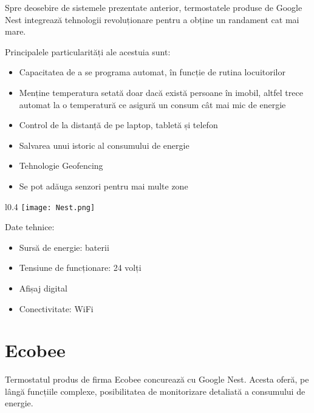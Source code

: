 	Spre deosebire de sistemele prezentate anterior, termostatele produse de Google Nest integrează tehnologii revoluționare pentru a obține un randament cat mai mare.

\vspace{2em}

	Principalele particularități ale acestuia sunt:
	\begin{itemize}
	\setlength{\itemindent}{2em}
		\itemsep0em
		\item Capacitatea de a se programa automat, în funcție de rutina locuitorilor
		\item Menține temperatura setată doar dacă există persoane în imobil, altfel trece automat la o temperatură ce asigură un consum cât mai mic de energie
		\item Control de la distanță de pe laptop, tabletă și telefon
		\item Salvarea unui istoric al consumului de energie
		\item Tehnologie Geofencing
		\item Se pot adăuga senzori pentru mai multe zone
	\end{itemize}

\vspace{2em}

\begin{wrapfigure}[5]{l}{0.4\textwidth}
\centering
\texttt{[image: Nest.png]}
\end{wrapfigure}

	Date tehnice:
	\begin{itemize}
	\setlength{\itemindent}{2em}
		\itemsep0em
		\item Sursă de energie: baterii
		\item Tensiune de funcționare: 24 volți
		\item Afișaj digital
		\item Conectivitate: WiFi
	\end{itemize}

\vspace{2em}

\section{Ecobee}
	 Termostatul produs de firma Ecobee concurează cu Google Nest. Acesta oferă, pe lângă funcțiile complexe, posibilitatea de monitorizare detaliată a consumului de energie.
	
\vspace{2em}

